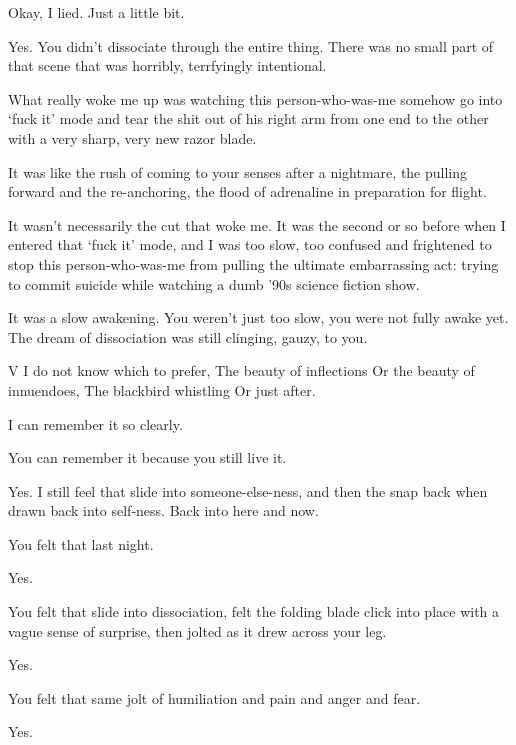 \noindent Okay, I lied. Just a little bit.

\begin{ally}
Yes. You didn't dissociate through the entire thing. There was no small part of that scene that was horribly, terrfyingly intentional.
\end{ally}
What really woke me up was watching this person-who-was-me somehow go into `fuck it' mode and tear the shit out of his right arm from one end to the other with a very sharp, very new razor blade.

It was like the rush of coming to your senses after a nightmare, the pulling forward and the re-anchoring, the flood of adrenaline in preparation for flight.

It wasn't necessarily the cut that woke me. It was the second or so before when I entered that `fuck it' mode, and I was too slow, too confused and frightened to stop this person-who-was-me from pulling the ultimate embarrassing act: trying to commit suicide while watching a dumb '90s science fiction show.

\begin{ally}
It was a slow awakening. You weren't just too slow, you were not fully awake yet. The dream of dissociation was still clinging, gauzy, to you.
\end{ally}
V I do not know which to prefer, The beauty of inflections Or the beauty of innuendoes, The blackbird whistling Or just after.

I can remember it so clearly.

\begin{ally}
You can remember it because you still live it.
\end{ally}
Yes. I still feel that slide into someone-else-ness, and then the snap back when drawn back into self-ness. Back into here and now.

\begin{ally}
You felt that last night.
\end{ally}
Yes.

\begin{ally}
You felt that slide into dissociation, felt the folding blade click into place with a vague sense of surprise, then jolted as it drew across your leg.
\end{ally}
Yes.

\begin{ally}
You felt that same jolt of humiliation and pain and anger and fear.
\end{ally}
Yes.

